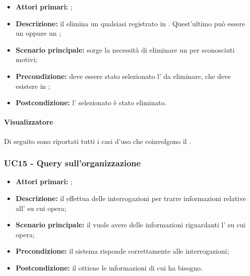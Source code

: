 \documentclass[../analisi-dei-requisiti]{subfiles}
\begin{document}
\begin{itemize}
\item \textbf{Attori primari:} ;
\item \textbf{Descrizione:} il  elimina un qualsiasi  registrato in . Quest'ultimo può essere un  oppure un ;
\item \textbf{Scenario principale:} sorge la necessità di eliminare un  per sconosciuti motivi; 
\item \textbf{Precondizione:} deve essere stato selezionato l' da eliminare, che deve esistere in ;
\item \textbf{Postcondizione:} l' selezionato è stato eliminato.

\end{itemize}



\paragraph{Visualizzatore}
Di seguito sono riportati tutti i casi d'uso che coinvolgono il  .


\subsubsection{UC15 - Query sull'organizzazione}
\label{subsub:UC15}

\begin{itemize}
\item \textbf{Attori primari:} ;
\item \textbf{Descrizione:} il  effettua delle interrogazioni per trarre informazioni relative all' su cui opera;
\item \textbf{Scenario principale:} il  vuole avere delle informazioni riguardanti l' su cui opera;
\item \textbf{Precondizione:} il sistema risponde correttamente alle interrogazioni;
\item \textbf{Postcondizione:} il  ottiene le informazioni di cui ha bisogno.

\end{itemize}
\end{document}
